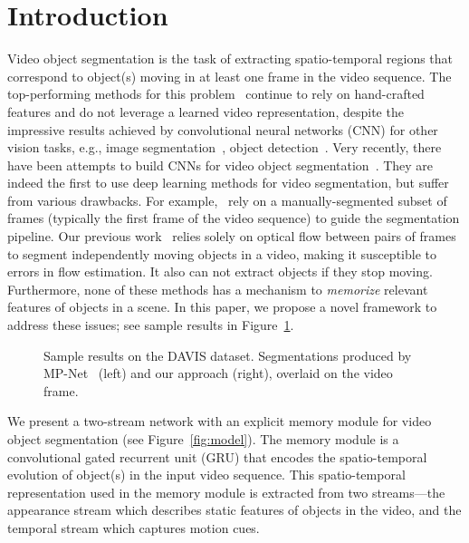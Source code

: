 \documentclass[10pt,twocolumn,letterpaper]{article}
\begin{document}
\section{Introduction}
\label{sec:intro}
Video object segmentation is the task of extracting spatio-temporal regions
that correspond to object(s) moving in at least one frame in the video
sequence. The top-performing methods for this
problem~\cite{papazoglou2013fast,Faktor14} continue to rely on hand-crafted
features and do not leverage a learned video representation, despite the
impressive results achieved by convolutional neural networks (CNN) for other
vision tasks, e.g., image segmentation~\cite{pinheiro2016learning}, object
detection~\cite{ren2015faster}. Very recently, there have been attempts to
build CNNs for video object
segmentation~\cite{tokmakov2016learning,Caelles17,Khoreva16}. They are indeed
the first to use deep learning methods for video segmentation, but suffer from
various drawbacks. For example,~\cite{Caelles17,Khoreva16} rely on a
manually-segmented subset of frames (typically the first frame of the video
sequence) to guide the segmentation pipeline. Our previous
work~\cite{tokmakov2016learning} relies solely on optical flow between pairs of
frames to segment independently moving objects in a video, making it
susceptible to errors in flow estimation. It also can not extract objects if
they stop moving. Furthermore, none of these methods has a mechanism to {\it
memorize} relevant features of objects in a scene. In this paper, we propose a
novel framework to address these issues; see sample results in
Figure~\ref{fig:teaser}.

\begin{figure}[t]
\begin{center}
\vspace{0.1cm}
\end{center}
\vspace{-0.7cm}\caption{Sample results on the DAVIS dataset. Segmentations
produced by MP-Net~\cite{tokmakov2016learning} (left) and our approach (right),
overlaid on the video frame.\vspace{-0.5cm}}
\label{fig:teaser}
\end{figure}

We present a two-stream network with an explicit memory module for video object
segmentation (see Figure~\ref{fig:model}). The memory module is a convolutional
gated recurrent unit (GRU) that encodes the spatio-temporal evolution of
object(s) in the input video sequence. This spatio-temporal representation used
in the memory module is extracted from two streams---the appearance stream
which describes static features of objects in the video, and the temporal
stream which captures motion cues.
\end{document}
